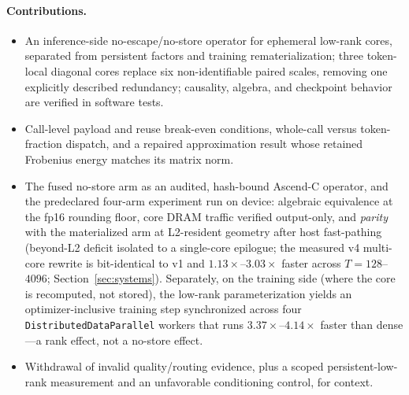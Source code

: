 \paragraph{Contributions.}
\begin{itemize}
  \item An inference-side no-escape/no-store operator for ephemeral low-rank
  cores, separated from persistent factors and training rematerialization;
  three token-local diagonal cores replace six non-identifiable
  paired scales, removing one explicitly described redundancy;
  causality, algebra, and checkpoint behavior are verified in
  software tests.
  \item Call-level payload and reuse break-even conditions, whole-call versus
  token-fraction dispatch, and a repaired approximation result whose retained
  Frobenius energy matches its matrix norm.
  \item The fused no-store arm as an audited, hash-bound Ascend-C operator,
  and the predeclared four-arm experiment run on device: algebraic
  equivalence at the fp16 rounding floor, core DRAM traffic verified
  output-only, and \emph{parity} with the materialized arm at L2-resident
  geometry after host fast-pathing (beyond-L2 deficit isolated to a
  single-core epilogue; the measured v4 multi-core rewrite is
  bit-identical to v1 and $1.13\times$--$3.03\times$ faster across
  $T{=}128$--$4096$; Section~\ref{sec:systems}).  Separately, on the training
  side (where the core is recomputed, not stored), the low-rank
  parameterization yields an optimizer-inclusive
  training step
  synchronized across four \texttt{DistributedDataParallel} workers
  that runs $3.37\times$--$4.14\times$ faster than dense---a rank effect, not
  a no-store effect.
  \item Withdrawal of invalid quality/routing evidence, plus a scoped
  persistent-low-rank measurement and an unfavorable conditioning control,
  for context.
\end{itemize}

